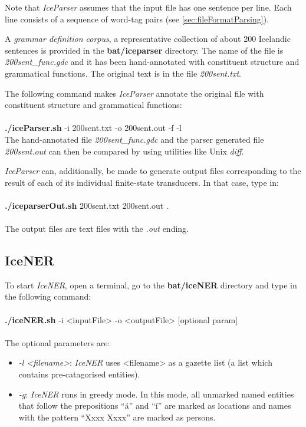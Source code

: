 \documentclass[11pt]{article}
\begin{document}
Note that \emph{IceParser} assumes that the input file has one sentence per line.
Each line consists of a sequence of word-tag pairs (see \ref{sec:fileFormatParsing}).

A \emph{grammar definition corpus}, a representative collection of about 200 Icelandic sentences \citep{lof06c} is provided in the \textbf{bat/iceparser} directory.
The name of the file is \emph{200sent\_func.gdc} and it has been hand-annotated with constituent structure and grammatical functions.
The original text is in the file \emph{200sent.txt}.

The following command makes \emph{IceParser} annotate the original file with constituent structure and grammatical functions: \\ \\
{\bf ./iceParser.sh} -i 200sent.txt -o 200sent.out -f -l \\

The hand-annotated file \emph{200sent\_func.gdc} and the parser generated file \emph{200sent.out} can then be compared by using utilities like Unix \emph{diff}.

\emph{IceParser} can, additionally, be made to generate output files corresponding to the result of each of its individual finite-state transducers.
In that case, type in: \\ \\
{\bf ./iceparserOut.sh} 200sent.txt 200sent.out . \\ \\
The output files are text files with the \emph{.out} ending.

\subsection{IceNER}
To start \emph{IceNER}, open a terminal, go to the \textbf{bat/iceNER} directory and type in the following command:\\ \\
{\bf ./iceNER.sh} -i <inputFile> -o <outputFile> [optional param] \\ \\
The optional parameters are:
\begin{itemize}
\item \emph{-l <filename>}: \emph{IceNER} uses <filename> as a gazette list (a list which contains pre-catagorised entities).
\item \emph{-g}: \emph{IceNER} runs in greedy mode. In this mode, all unmarked named entities that follow the prepositions ``á'' and ``í'' are marked as locations and names with the pattern ``Xxxx Xxxx'' are marked as persons.
\end{itemize}
\end{document}
